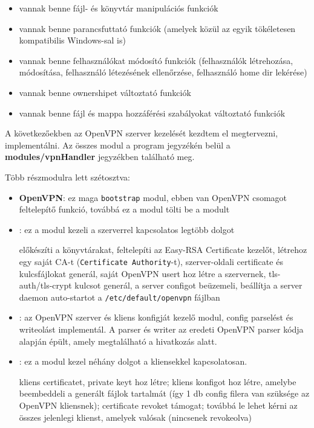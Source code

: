 \begin{itemize}
	\item vannak benne fájl- és könyvtár manipulációs funkciók
	\item vannak benne parancsfuttató funkciók (amelyek közül az egyik tökéletesen kompatibilis Windows-sal is)
	\item vannak benne felhasználókat módosító funkciók (felhasználók létrehozása, módosítása, felhasználó létezésének ellenőrzése, felhasználó home dir lekérése)
	\item vannak benne ownershipet változtató funkciók
	\item vannak benne fájl és mappa hozzáférési szabályokat változtató funkciók
\end{itemize}

\pagebreak


A következőekben az OpenVPN szerver kezelését kezdtem el megtervezni, implementálni. Az összes modul a program jegyzékén belül a \textbf{modules/vpnHandler} jegyzékben található meg.

Több részmodulra lett szétosztva:
\begin{itemize}
	\item \textbf{OpenVPN}: ez maga \texttt{bootstrap} modul, ebben van OpenVPN csomagot feltelepítő funkció, továbbá ez a modul tölti be a \texttt{} modult
	\item \textbf{}: ez a modul kezeli a szerverrel kapcsolatos legtöbb dolgot
	
	előkészíti a könyvtárakat, feltelepíti az Easy-RSA Certificate kezelőt, létrehoz egy saját CA-t (\texttt{Certificate Authority}-t), szerver-oldali certificate és kulcsfájlokat generál, saját OpenVPN usert hoz létre a szervernek, tls-auth/tls-crypt kulcsot generál, a server configot beüzemeli, beállítja a server daemon auto-startot a \texttt{/etc/default/openvpn} fájlban

	\item \textbf{}: az OpenVPN szerver és kliens konfigját kezelő modul, config parselést és writeolást implementál. A parser és writer az eredeti OpenVPN parser kódja alapján épült, amely megtalálható a \cite{openvpn_parser} hivatkozás alatt.
	\item \textbf{}: ez a modul kezel néhány dolgot a kliensekkel kapcsolatosan.
	
	kliens certificatet, private keyt hoz létre; kliens konfigot hoz létre, amelybe beembeddeli a generált fájlok tartalmát (így 1 db config filera van szüksége az OpenVPN kliensnek); certificate revoket támogat; továbbá le lehet kérni az összes jelenlegi klienst, amelyek valósak (nincsenek revokeolva)
\end{itemize}


